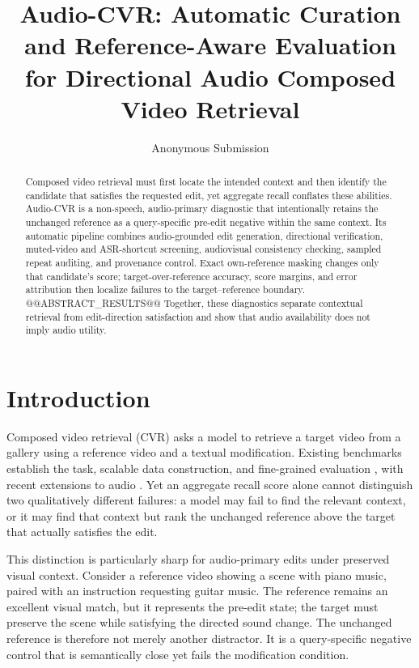 \documentclass[letterpaper]{article}
\title{Audio-CVR: Automatic Curation and Reference-Aware Evaluation for Directional Audio Composed Video Retrieval}
\author{Anonymous Submission}
\begin{document}
\maketitle

\begin{abstract}
Composed video retrieval must first locate the intended context and then identify the candidate that satisfies the requested edit, yet aggregate recall conflates these abilities.
Audio-CVR is a non-speech, audio-primary diagnostic that intentionally retains the unchanged reference as a query-specific pre-edit negative within the same context.
Its automatic pipeline combines audio-grounded edit generation, directional verification, muted-video and ASR-shortcut screening, audiovisual consistency checking, sampled repeat auditing, and provenance control.
Exact own-reference masking changes only that candidate's score; target-over-reference accuracy, score margins, and error attribution then localize failures to the target--reference boundary.
@@ABSTRACT_RESULTS@@
Together, these diagnostics separate contextual retrieval from edit-direction satisfaction and show that audio availability does not imply audio utility.
\end{abstract}

\section{Introduction}

Composed video retrieval (CVR) asks a model to retrieve a target video from a gallery using a reference video and a textual modification.
Existing benchmarks establish the task, scalable data construction, and fine-grained evaluation \cite{ventura2024covr2,ventura2024covr,hummel2024egocvr}, with recent extensions to audio \cite{ji2026omnicvr,han2026cova}.
Yet an aggregate recall score alone cannot distinguish two qualitatively different failures: a model may fail to find the relevant context, or it may find that context but rank the unchanged reference above the target that actually satisfies the edit.

This distinction is particularly sharp for audio-primary edits under preserved visual context.
Consider a reference video showing a scene with piano music, paired with an instruction requesting guitar music.
The reference remains an excellent visual match, but it represents the pre-edit state; the target must preserve the scene while satisfying the directed sound change.
The unchanged reference is therefore not merely another distractor.
It is a query-specific negative control that is semantically close yet fails the modification condition.
\end{document}

